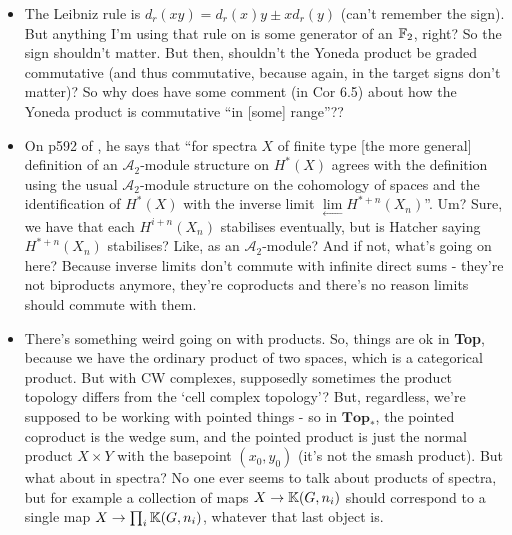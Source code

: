 \documentclass{MetricNotes2023}
\def\bb{\ensuremath\mathbb}
\def\subq{\ensuremath\subseteq}
\def\inte{\ensuremath\mathbb{Z}}
\def\A{\ensuremath{\mathscr{A}_2}}
\begin{document}
\begin{itemize}

\item The Leibniz rule is \(d_r(xy)=d_r(x)y\pm xd_r(y)\) (can't remember the sign). But anything I'm using that rule on is some generator of an \(\bb{F}_2\), right? So the sign shouldn't matter. But then, shouldn't the Yoneda product be graded commutative (and thus commutative, because again, in the target signs don't matter)? So why does \autocite{ass} have some comment (in Cor 6.5) about how the Yoneda product is commutative ``in [some] range''?? 

\item On p592 of \autocite{hatcher5}, he says that ``for spectra \(X\) of finite type [the more general] definition of an \(\A\)-module structure on \(H^*(X)\) agrees with the definition using the usual \(\A\)-module structure on the cohomology of spaces and the identification of \(H^*(X)\) with the inverse limit \(\lim\limits_{\leftarrow}H^{*+n}(X_n)\)''. Um? Sure, we have that each \(H^{i+n}(X_n)\) stabilises eventually, but is Hatcher saying \(H^{*+n}(X_n)\) stabilises? Like, as an \(\A\)-module? And if not, what's going on here? Because inverse limits don't commute with infinite direct sums - they're not biproducts anymore, they're coproducts and there's no reason limits should commute with them. 

\item There's something weird going on with products. So, things are ok in \textbf{Top}, because we have the ordinary product of two spaces, which is a categorical product. But with CW complexes, supposedly sometimes the product topology differs from the `cell complex topology'? But, regardless, we're supposed to be working with pointed things - so in \(\textbf{Top}_*\), the pointed coproduct is the wedge sum, and the pointed product is just the normal product \(X\times Y\) with the basepoint \((x_0,y_0)\) (it's not the smash product). But what about in spectra? No one ever seems to talk about products of spectra, but for example a collection of maps \(X\to \bb{K}(G,n_i)\) should correspond to a single map \(X\to \prod_i \bb{K}(G,n_i)\), whatever that last object is. 


\end{itemize}
\end{document}
